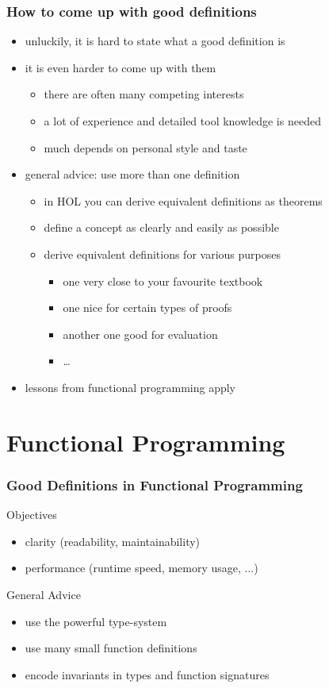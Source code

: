 \begin{frame}
\frametitle{How to come up with good definitions}
\begin{itemize}
\item unluckily, it is hard to state what a good definition is
\item it is even harder to come up with them
\begin{itemize}
\item there are often many competing interests
\item a lot of experience and detailed tool knowledge is needed
\item much depends on personal style and taste
\end{itemize}
\item general advice: use more than one definition
\begin{itemize}
\item in HOL you can derive equivalent definitions as theorems
\item define a concept as clearly and easily as possible
\item derive equivalent definitions for various purposes
\begin{itemize}
\item one very close to your favourite textbook
\item one nice for certain types of proofs
\item another one good for evaluation
\item \ldots
\end{itemize}
\end{itemize}
\item lessons from functional programming apply
\end{itemize}
\end{frame}


\section{Functional Programming}

\begin{frame}
\frametitle{Good Definitions in Functional Programming}

\begin{block}{Objectives}
\begin{itemize}
\item clarity (readability, maintainability)
\item performance (runtime speed, memory usage, ...)
\end{itemize}
\end{block}

\begin{block}{General Advice}
\begin{itemize}
\item use the powerful type-system
\item use many small function definitions
\item encode invariants in types and function signatures
\end{itemize}
\end{block}

\end{frame}

